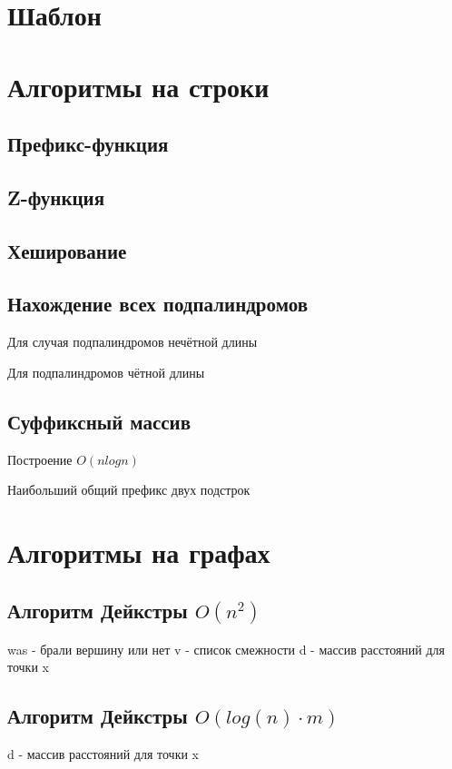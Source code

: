 \documentclass[a4paper]{article}
\begin{document}
	\begin{multicols*}{2}
		\section{Шаблон}
		
		
		\section{Алгоритмы на строки}
		\subsection{Префикс-функция}
		
		\subsection{Z-функция}
		
		\subsection{Хеширование}
		
		\subsection{Нахождение всех подпалиндромов}
		Для случая подпалиндромов нечётной длины
		
		Для подпалиндромов чётной длины
		
		\subsection{Суффиксный массив}
		Построение $O (n log n) $
		
		Наибольший общий префикс двух подстрок
		
		
		
		\section{Алгоритмы на графах}
		\subsection{Алгоритм Дейкстры $O(n^2)$}
		was - брали вершину или нет 
		v - список смежности 
		d - массив расстояний для точки x
		
		\subsection{Алгоритм Дейкстры $O(log(n) \cdot m)$}
		d - массив расстояний для точки x
				

\end{multicols*}
\end{document}
